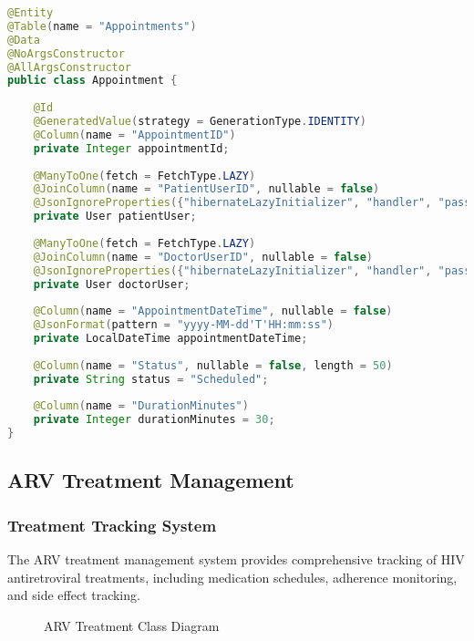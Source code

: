 \documentclass[12pt,a4paper]{article}
\begin{document}
\begin{lstlisting}[language=Java, caption=Appointment Entity]
@Entity
@Table(name = "Appointments")
@Data
@NoArgsConstructor
@AllArgsConstructor
public class Appointment {
    
    @Id
    @GeneratedValue(strategy = GenerationType.IDENTITY)
    @Column(name = "AppointmentID")
    private Integer appointmentId;
    
    @ManyToOne(fetch = FetchType.LAZY)
    @JoinColumn(name = "PatientUserID", nullable = false)
    @JsonIgnoreProperties({"hibernateLazyInitializer", "handler", "passwordHash"})
    private User patientUser;
    
    @ManyToOne(fetch = FetchType.LAZY)
    @JoinColumn(name = "DoctorUserID", nullable = false)
    @JsonIgnoreProperties({"hibernateLazyInitializer", "handler", "passwordHash"})
    private User doctorUser;
    
    @Column(name = "AppointmentDateTime", nullable = false)
    @JsonFormat(pattern = "yyyy-MM-dd'T'HH:mm:ss")
    private LocalDateTime appointmentDateTime;
    
    @Column(name = "Status", nullable = false, length = 50)
    private String status = "Scheduled";
    
    @Column(name = "DurationMinutes")
    private Integer durationMinutes = 30;
}
\end{lstlisting}

\subsection{ARV Treatment Management}

\subsubsection{Treatment Tracking System}

The ARV treatment management system provides comprehensive tracking of HIV antiretroviral treatments, including medication schedules, adherence monitoring, and side effect tracking.

\begin{figure}[H]
\centering
{}
\caption{ARV Treatment Class Diagram}
\label{fig:arv-treatment-class}
\end{figure}
\end{document}
